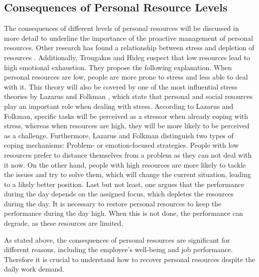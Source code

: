 \documentclass{hasel_thesis}
\begin{document}
\subsection{Consequences of Personal Resource Levels}
The consequences of different levels of personal resources will be discussed in more detail to underline the importance of the proactive management of personal resources. 
Other research has found a relationship between stress and depletion of resources \cite{Sonnentag.2001}. Additionally, Trougakos and Hideg \cite{Trougakos.2009} suspect that low resources lead to high emotional exhaustion. They propose the following explanation. When personal resources are low, people are more prone to stress and less able to deal with it. This theory will also be covered by one of the most influential stress theories by Lazarus and Folkman \cite{Lazarus.1984}, which state that personal and social resources play an important role when dealing with stress. According to Lazarus and Folkman, specific tasks will be perceived as a stressor when already coping with stress, whereas when resources are high, they will be more likely to be perceived as a challenge.
Furthermore, Lazarus and Folkman \cite{Lazarus.1984} distinguish two types of coping mechanisms: Problem- or emotion-focused strategies. People with low resources prefer to distance themselves from a problem as they can not deal with it now. On the other hand, people with high resources are more likely to tackle the issues and try to solve them, which will change the current situation, leading to a likely better position.
Last but not least, one \cite{Trougakos.2009} argues that the performance during the day depends on the assigned focus, which depletes the resources during the day. It is necessary to restore personal resources to keep the performance during the day high. When this is not done, the performance can degrade\cite{Trougakos.2009}, as these resources are limited.

As stated above, the consequences of personal resources are significant for different reasons, including the employee's well-being and job performance. Therefore it is crucial to understand how to recover personal resources despite the daily work demand.
 
\end{document}
